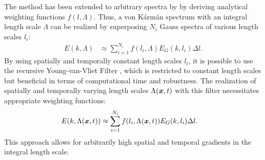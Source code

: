 The method has been extended to arbitrary spectra by \citet{wohlbrandt_analytical_2016} by deriving analytical weighting functions $f(l,\Lambda)$. Thus, a von K\'arm\'an spectrum with an integral length scale $\Lambda$ can be realized by superposing $N_i$ Gauss spectra of various length scales $l_i$:
\begin{align}
E(k,\Lambda) &\approx \sum\limits_{i=1}^{N_i} f(l_i,\Lambda) E_G(k,l_i) \Delta l. \label{eq:weighting_disketerAnsatz}
\end{align}
By using spatially and temporally constant length scales $l_i$, it is possible to use the recursive Young-van-Vliet Filter \cite{young_recursive_1995}, which is restricted to constant length scales but beneficial in terms of computational time and robustness. 
The realization of spatially and temporally varying length scales $\Lambda({\boldsymbol{x}},t)$ with this filter necessitates appropriate weighting functions:
\begin{align}
E(k,\Lambda({\boldsymbol{x}},t)) &\approx \sum\limits_{i=1}^{N_i} f(l_i,\Lambda({\boldsymbol{x}},t)) E_G(k,l_i) \Delta l. \label{eq:weighting_timeDep}
\end{align}
This approach allows for arbitrarily high spatial and temporal gradients in the integral length scale. 
